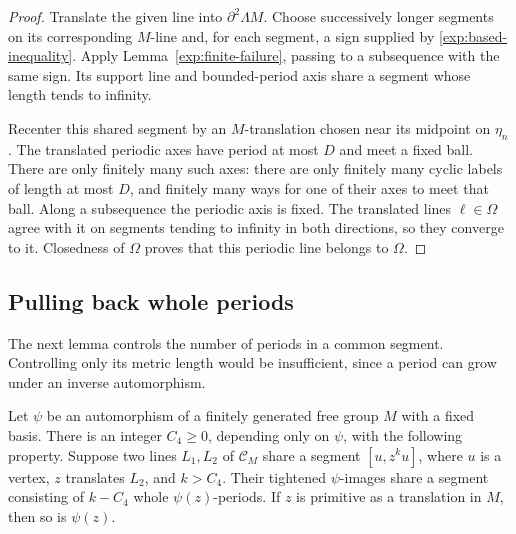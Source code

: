 \begin{proof}
Translate the given line into $\partial^2\Lambda M$. Choose
successively longer segments on its corresponding $M$-line and,
for each segment, a sign supplied by \eqref{exp:based-inequality}.
Apply Lemma~\ref{exp:finite-failure}, passing to a subsequence with
the same sign. Its support line and bounded-period axis share a
segment whose length tends to infinity.

Recenter this shared segment
by an $M$-translation chosen near its midpoint on $\eta_n$.
The translated periodic axes have period at most $D$ and meet a
fixed ball. There are only finitely many such axes: there are only
finitely many cyclic labels of length at most $D$, and finitely many
ways for one of their axes to meet that ball. Along a subsequence
the periodic axis is fixed. The translated lines $\ell\in\Omega$
agree with it on segments tending to infinity in both directions,
so they converge to it. Closedness of $\Omega$ proves that this
periodic line belongs to $\Omega$.
\end{proof}

\subsection{Pulling back whole periods}

The next lemma controls the number of periods in a common segment.
Controlling only its metric length would be insufficient, since a
period can grow under an inverse automorphism.

\begin{lemma}
\label{exp:period-pullback}
Let $\psi$ be an automorphism of a finitely generated free group $M$
with a fixed basis. There is an integer $C_4\ge0$, depending only on
$\psi$, with the following property. Suppose two lines $L_1,L_2$
of $\mathcal C_M$ share a segment $[u,z^k u]$, where $u$ is a
vertex, $z$ translates $L_2$, and $k>C_4$. Their tightened
$\psi$-images share a segment consisting of $k-C_4$ whole
$\psi(z)$-periods. If $z$ is primitive as a translation in $M$,
then so is $\psi(z)$.
\end{lemma}

